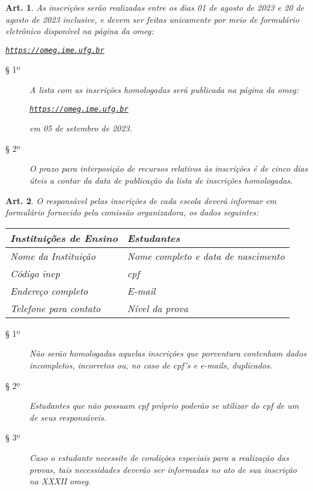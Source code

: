 \documentclass[a4paper,12pt]{article}
\newtheorem{article}{Art.}
\def\url{https://omeg.ime.ufg.br}
\def\homepage{\href{\url}{\texttt{\url}}}
\def\currentEdition{XXXII}
\def\year{2023}
\def\registrationOpening{01 de agosto de \year}
\def\registrationClosing{20 de agosto de \year}
\def\publicationOfAprovedRegistrations{05 de setembro de \year}
\begin{document}
\begin{article}
  As inscrições serão realizadas entre os dias \registrationOpening{} e
  \registrationClosing{} inclusive, e devem ser feitas unicamente por meio de
  formulário eletrônico disponível na página da \acrshort{omeg}:
  \begin{center}
    \homepage
  \end{center}
  \begin{description}
    \item[§ 1º]
      A lista com as inscrições homologadas será publicada na página da
      \acrshort{omeg}:
      \begin{center}
        \homepage
      \end{center}
      em \publicationOfAprovedRegistrations{}.
    \item[§ 2º]
      O prazo para interposição de recursos relativos às inscrições é de cinco
      dias úteis a contar da data de publicação da lista de inscrições
      homologadas.
  \end{description}
\end{article}

\begin{article}
  O responsável pelas inscrições de cada escola deverá informar em formulário
  fornecido pela comissão organizadora, os dados seguintes:

  \begin{table}[H]
    \centering
    \begin{tabular}{l|l}
      \textbf{Instituições de Ensino} & \textbf{Estudantes}                \\ \hline
      Nome da Instituição             & Nome completo e data de nascimento \\
      Código \acrshort{inep}          & \acrshort{cpf}                     \\
      Endereço completo               & E-mail                             \\
      Telefone para contato           & Nível da prova
    \end{tabular}
  \end{table}

  \begin{description}
    \item[§ 1º]
      Não serão homologadas aquelas inscrições que porventura contenham dados
      incompletos, incorretos ou, no caso de \acrshort{cpf}'s e e-mails,
      duplicados.
    \item[§ 2º]
      Estudantes que não possuam \acrshort{cpf} próprio poderão se utilizar do
      \acrshort{cpf} de um de seus responsáveis.
    \item[§ 3º]
      Caso o estudante necessite de condições especiais para a realização das
      provas, tais necessidades deverão ser informadas no ato de sua inscrição
      na \currentEdition{} \acrshort{omeg}.
  \end{description}
\end{article}
\end{document}
